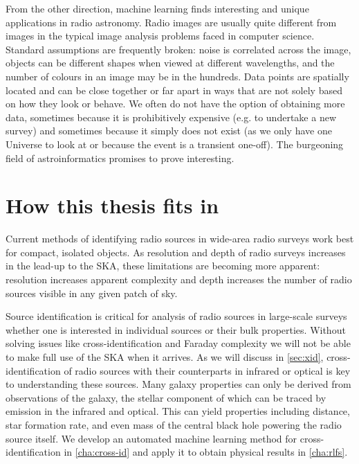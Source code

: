     From the other direction, machine learning finds interesting and unique applications in radio astronomy. Radio images are usually quite different from images in the typical image analysis problems faced in computer science. Standard assumptions are frequently broken: noise is correlated across the image, objects can be different shapes when viewed at different wavelengths, and the number of colours in an image may be in the hundreds. Data points are spatially located and can be close together or far apart in ways that are not solely based on how they look or behave. We often do not have the option of obtaining more data, sometimes because it is prohibitively expensive (e.g. to undertake a new survey) and sometimes because it simply does not exist (as we only have one Universe to look at or because the event is a transient one-off). The burgeoning field of astroinformatics promises to prove interesting.

\section{How this thesis fits in}
\label{sec:how-this-fits}

    Current methods of identifying radio sources in wide-area radio surveys work best for compact, isolated objects. As resolution and depth of radio surveys increases in the lead-up to the SKA, these limitations are becoming more apparent: resolution increases apparent complexity and depth increases the number of radio sources visible in any given patch of sky.

    Source identification is critical for analysis of radio sources in large-scale surveys whether one is interested in individual sources or their bulk properties. Without solving issues like cross-identification and Faraday complexity we will not be able to make full use of the SKA when it arrives. As we will discuss in \autoref{sec:xid}, cross-identification of radio sources with their counterparts in infrared or optical is key to understanding these sources. Many galaxy properties can only be derived from observations of the galaxy, the stellar component of which can be traced by emission in the infrared and optical. This can yield properties including distance, star formation rate, and even mass of the central black hole powering the radio source itself. We develop an automated machine learning method for cross-identification in \autoref{cha:cross-id} and apply it to obtain physical results in \autoref{cha:rlfs}.

